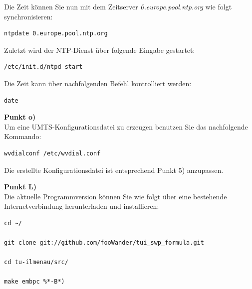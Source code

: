 \documentclass[fontsize = 12pt, paper = a4]{scrreprt}
\begin{document}
Die Zeit können Sie nun mit dem Zeitserver \textit{0.europe.pool.ntp.org} wie folgt synchronisieren:

\vspace*{4mm}
\begin{lstlisting}[frame=single]
ntpdate 0.europe.pool.ntp.org
\end{lstlisting} 
\vspace*{-2mm}

Zuletzt wird der NTP-Dienst über folgende Eingabe gestartet: 

\vspace*{4mm}
\begin{lstlisting}[frame=single]
/etc/init.d/ntpd start
\end{lstlisting} 
\vspace*{-2mm}

Die Zeit kann über nachfolgenden Befehl kontrolliert werden:

\vspace*{4mm}
\begin{lstlisting}[frame=single]
date
\end{lstlisting} 
\vspace*{-2mm}

\textbf{Punkt o)} \\

Um eine UMTS-Konfigurationsdatei zu erzeugen benutzen Sie das nachfolgende Kommando:

\vspace*{3mm}
\begin{lstlisting}[frame=single]
wvdialconf /etc/wvdial.conf
\end{lstlisting} 
\vspace*{-2mm}

Die erstellte Konfigurationsdatei ist entsprechend Punkt 5) anzupassen.

\newpage

\textbf{Punkt L)} \\

Die aktuelle Programmversion können Sie wie folgt über eine bestehende Internetverbindung herunterladen und installieren:

\vspace*{4mm}
\begin{lstlisting}[frame=single]
cd ~/
 
git clone git://github.com/fooWander/tui_swp_formula.git

cd tu-ilmenau/src/

make embpc %*-B*)
\end{lstlisting} 
\vspace*{-2mm}
\end{document}
